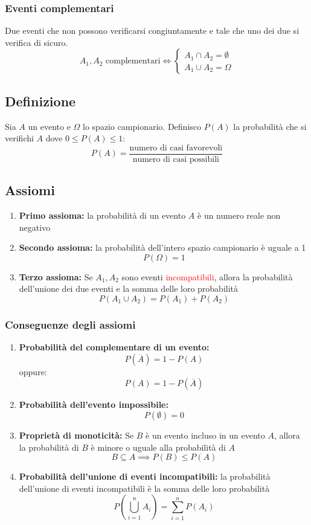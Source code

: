 \documentclass{article}  %
\theoremstyle{definition}
\begin{document}
\subsubsection{Eventi complementari}
Due eventi che non possono verificarsi congiuntamente e tale che uno dei due si verifica di sicuro.
\[
	A_1, A_2 \text{ complementari}\iff
	\begin{cases}
		A_1 \cap A_2 = \emptyset \\
		A_1 \cup A_2 = \Omega
	\end{cases}
\]

\subsection{Definizione}
Sia $A$ un evento e $\Omega$ lo spazio campionario. Definisco $P(A)$ la probabilità che si verifichi $A$ dove $0 \leq P(A) \leq 1$:
\[
	P(A)=\frac{\text{numero di casi favorevoli}}{\text{numero di casi possibili}}
\]

\subsection{Assiomi}
\begin{enumerate}
	\item \textbf{Primo assioma:} la probabilità di un evento $A$ è un numero reale non negativo
	\item \textbf{Secondo assioma:} la probabilità dell'intero spazio campionario è uguale a 1
	      \[P(\Omega)=1\]
	\item \textbf{Terzo assioma:} Se $A_1, A_2$ sono eventi \textcolor{red}{incompatibili}, allora la probabilità dell'unione dei due eventi e la somma
	      delle loro probabilità
	      \[
		      P(A_1 \cup A_2)=P(A_1)+P(A_2)
	      \]
\end{enumerate}
\subsubsection{Conseguenze degli assiomi}
\begin{enumerate}
	\item \textbf{Probabilità del complementare di un evento:}
	      \[
		      P(\overline{A})=1-P(A)
	      \]
	      oppure:
	      \[
		      P(A)=1-P(\overline{A})
	      \]
	\item \textbf{Probabilità dell'evento impossibile:}
	      \[
		      P(\emptyset)=0
	      \]
	\item \textbf{Proprietà di monoticità:} Se $B$ è un evento incluso in un evento $A$, allora la probabilità di $B$ è minore
	      o uguale alla probabilità di $A$
	      \[
		      B \subseteq A \implies P(B) \leq P(A)
	      \]
	\item \textbf{Probabilità dell'unione di eventi incompatibili:} la probabilità dell'unione di eventi incompatibili
	      è la somma delle loro probabilità
	      \[
		      P\!\left( \bigcup_{i=1}^{n} A_i \right)
		      =
		      \sum_{i=1}^{n} P(A_i)
	      \]
\end{enumerate}
\end{document}
